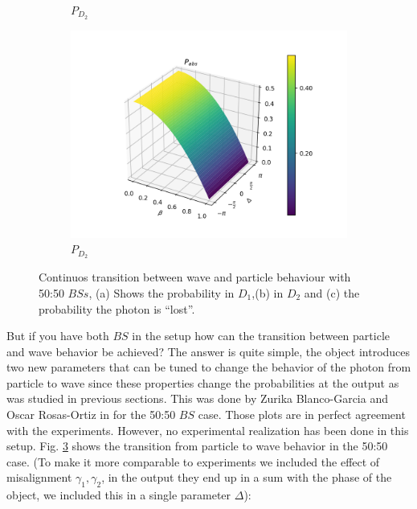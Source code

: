 \documentclass{book}
\begin{document}
\begin{figure}[H]
\begin{subfigure}[b]{0.30\linewidth}
\caption{$P_{D_{2}}$ }
\label{fig:BS1}
\end{subfigure}
\begin{subfigure}[b]{0.30\linewidth}
\includegraphics[width=\linewidth]{images/pabs_2.png}
\caption{$P_{D_{2}}$ }
\label{fig:BS1}
\end{subfigure}
\caption{Continuos transition between wave and particle behaviour with 50:50 $BSs$, (a) Shows the probability in $D_{1}$,(b) in $D_{2}$ and (c) the probability the photon is ``lost''.}
\label{transzuri}
\end{figure}

But if you have both $BS$ in the setup how can the transition between particle and wave behavior be achieved? The answer is quite simple, the object introduces two new parameters that can be tuned to change the behavior of the photon from particle to wave since these properties change the probabilities at the output as was studied in previous sections. This was done by Zurika Blanco-Garcia and Oscar Rosas-Ortiz in \cite{azuri} for the 50:50 $BS$ case. Those plots are in perfect agreement with the experiments. However, no experimental realization has been done in this setup. Fig. \ref{transzuri} shows the transition from particle to wave behavior in the 50:50 case. (To make it more comparable to experiments we included the effect of misalignment $\gamma_{1},\gamma_{2}$, in the output they end up in a sum with the phase of the object, we included this in a single parameter $\Delta$):
\end{document}
